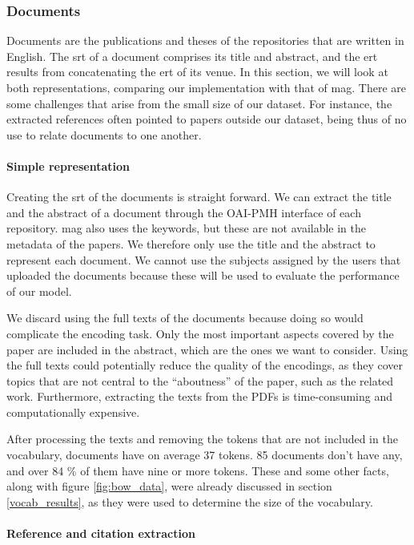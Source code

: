 \subsubsection{Documents}

Documents are the publications and theses of the repositories that are written in English. The \acrshort{srt} of a document comprises its title and abstract, and the \acrshort{ert} results from concatenating the \acrshort{ert} of its venue. In this section, we will look at both representations, comparing our implementation with that of \acrshort{mag}. There are some challenges that arise from the small size of our dataset. For instance, the extracted references often pointed to papers outside our dataset, being thus of no use to relate documents to one another.

\paragraph{Simple representation} \mbox{}

Creating the \acrshort{srt} of the documents is straight forward. We can extract the title and the abstract of a document through the OAI-PMH interface of each repository. \acrshort{mag} also uses the keywords, but these are not available in the metadata of the papers. We therefore only use the title and the abstract to represent each document. We cannot use the subjects assigned by the users that uploaded the documents because these will be used to evaluate the performance of our model.

We discard using the full texts of the documents because doing so would complicate the encoding task. Only the most important aspects covered by the paper are included in the abstract, which are the ones we want to consider. Using the full texts could potentially reduce the quality of the encodings, as they cover topics that are not central to the ``aboutness'' of the paper, such as the related work. Furthermore, extracting the texts from the PDFs is time-consuming and computationally expensive.

After processing the texts and removing the tokens that are not included in the vocabulary, documents have on average 37 tokens. 85 documents don't have any, and over 84 \% of them have nine or more tokens. These and some other facts, along with figure \ref{fig:bow_data}, were already discussed in section \ref{vocab_results}, as they were used to determine the size of the vocabulary.

\paragraph{Reference and citation extraction} \mbox{} \label{unsupervised_approach_references}


